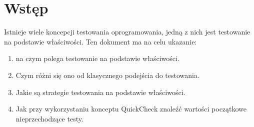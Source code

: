\section{Wstęp}
Istnieje wiele koncepcji testowania oprogramowania, jedną z nich jest testowanie na podstawie właściwości.
Ten dokument ma na celu ukazanie:
\begin{enumerate}
  \item na czym polega testowanie na podstawie właściwości.
  \item Czym różni się ono od klasycznego podejścia do testowania.
  \item Jakie są strategie testowania na podstawie właściwości. 
  \item Jak przy wykorzystaniu konceptu QuickCheck znaleźć wartości początkowe nieprzechodzące testy.
\end{enumerate}
